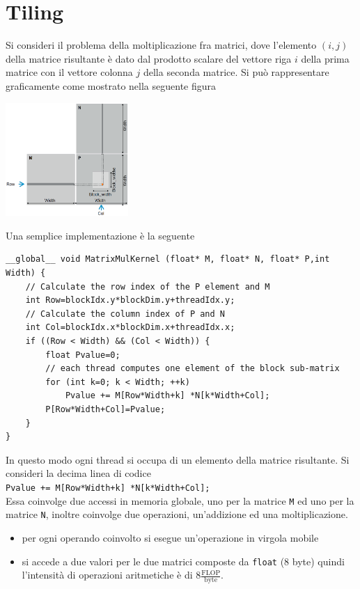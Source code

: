 \documentclass[10pt, letterpaper]{report}
\begin{document}
\section{Tiling}
Si consideri il problema della moltiplicazione fra matrici, dove l'elemento $(i,j)$ della matrice risultante è dato dal prodotto scalare del vettore riga $i$ della prima matrice con il vettore colonna $j$ della seconda matrice.\acc 
Si può rappresentare graficamente come mostrato nella seguente figura\begin{center}
    \includegraphics[width=0.35\textwidth ]{images/matrixMult.png}\end{center}
Una semplice implementazione è la seguente
\begin{lstlisting}[style=CStyle]
__global__ void MatrixMulKernel (float* M, float* N, float* P,int Width) {
    // Calculate the row index of the P element and M
    int Row=blockIdx.y*blockDim.y+threadIdx.y;
    // Calculate the column index of P and N
    int Col=blockIdx.x*blockDim.x+threadIdx.x;
    if ((Row < Width) && (Col < Width)) {
        float Pvalue=0;
        // each thread computes one element of the block sub-matrix
        for (int k=0; k < Width; ++k) 
            Pvalue += M[Row*Width+k] *N[k*Width+Col];
        P[Row*Width+Col]=Pvalue;
    }                          
}
\end{lstlisting}
In questo modo ogni thread si occupa di un elemento della matrice risultante. Si consideri la decima linea di codice\\\texttt{Pvalue += M[Row*Width+k] *N[k*Width+Col];} \\
Essa coinvolge due accessi in memoria globale, uno per la matrice \texttt{M} ed uno per la matrice \texttt{N}, inoltre coinvolge due operazioni, un'addizione ed una moltiplicazione.\begin{itemize}
    \item per ogni operando coinvolto si esegue un'operazione in virgola mobile
    \item si accede a due valori per le due matrici composte da \texttt{float} (8 byte) quindi l'intensità di operazioni aritmetiche è di 8$\frac{\text{FLOP}}{\text{byte}}$.
\end{itemize}
\end{document}
